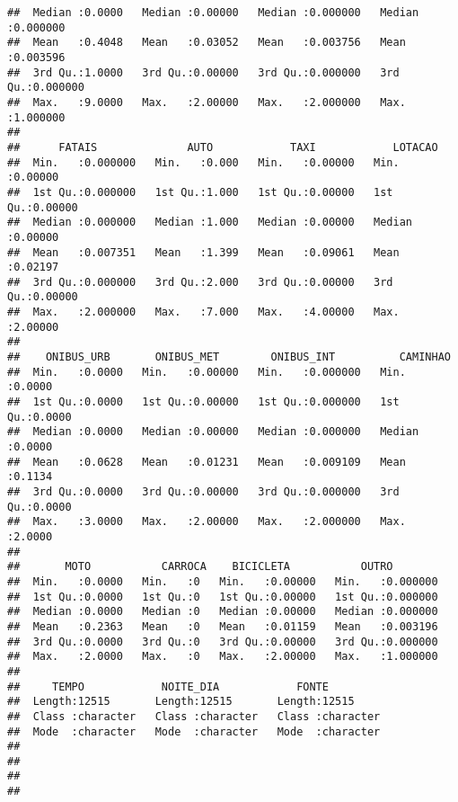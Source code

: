 \documentclass[]{article}
\begin{document}
\begin{verbatim}
##  Median :0.0000   Median :0.00000   Median :0.000000   Median :0.000000  
##  Mean   :0.4048   Mean   :0.03052   Mean   :0.003756   Mean   :0.003596  
##  3rd Qu.:1.0000   3rd Qu.:0.00000   3rd Qu.:0.000000   3rd Qu.:0.000000  
##  Max.   :9.0000   Max.   :2.00000   Max.   :2.000000   Max.   :1.000000  
##                                                                          
##      FATAIS              AUTO            TAXI            LOTACAO       
##  Min.   :0.000000   Min.   :0.000   Min.   :0.00000   Min.   :0.00000  
##  1st Qu.:0.000000   1st Qu.:1.000   1st Qu.:0.00000   1st Qu.:0.00000  
##  Median :0.000000   Median :1.000   Median :0.00000   Median :0.00000  
##  Mean   :0.007351   Mean   :1.399   Mean   :0.09061   Mean   :0.02197  
##  3rd Qu.:0.000000   3rd Qu.:2.000   3rd Qu.:0.00000   3rd Qu.:0.00000  
##  Max.   :2.000000   Max.   :7.000   Max.   :4.00000   Max.   :2.00000  
##                                                                        
##    ONIBUS_URB       ONIBUS_MET        ONIBUS_INT          CAMINHAO     
##  Min.   :0.0000   Min.   :0.00000   Min.   :0.000000   Min.   :0.0000  
##  1st Qu.:0.0000   1st Qu.:0.00000   1st Qu.:0.000000   1st Qu.:0.0000  
##  Median :0.0000   Median :0.00000   Median :0.000000   Median :0.0000  
##  Mean   :0.0628   Mean   :0.01231   Mean   :0.009109   Mean   :0.1134  
##  3rd Qu.:0.0000   3rd Qu.:0.00000   3rd Qu.:0.000000   3rd Qu.:0.0000  
##  Max.   :3.0000   Max.   :2.00000   Max.   :2.000000   Max.   :2.0000  
##                                                                        
##       MOTO           CARROCA    BICICLETA           OUTRO         
##  Min.   :0.0000   Min.   :0   Min.   :0.00000   Min.   :0.000000  
##  1st Qu.:0.0000   1st Qu.:0   1st Qu.:0.00000   1st Qu.:0.000000  
##  Median :0.0000   Median :0   Median :0.00000   Median :0.000000  
##  Mean   :0.2363   Mean   :0   Mean   :0.01159   Mean   :0.003196  
##  3rd Qu.:0.0000   3rd Qu.:0   3rd Qu.:0.00000   3rd Qu.:0.000000  
##  Max.   :2.0000   Max.   :0   Max.   :2.00000   Max.   :1.000000  
##                                                                   
##     TEMPO            NOITE_DIA            FONTE          
##  Length:12515       Length:12515       Length:12515      
##  Class :character   Class :character   Class :character  
##  Mode  :character   Mode  :character   Mode  :character  
##                                                          
##                                                          
##                                                          
##                                                          

\end{verbatim}
\end{document}
